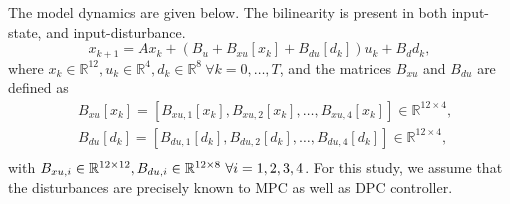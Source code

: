 The model dynamics are given below. The bilinearity is present in both input-state, and input-disturbance.
\begin{equation}\label{E:bilinear1}
x_{k+1} = Ax_{k}+(B_u +B_{xu}[x_k] + B_{du}[d_k]) u_k+B_dd_k,
\end{equation}
where $x_{k} \in \mathbb{R}^{12}, u_{k} \in \mathbb{R}^{4}, d_{k} \in \mathbb{R}^{8} \ \forall k = 0,\dots,T$, and the matrices $B_{xu}$ and $B_{du}$ are defined as
\begin{equation}
	\begin{aligned}
		&B_{xu}[x_k] = [ B_{xu,1}[x_k],B_{xu,2}[x_k], \dots, B_{xu,4}[x_k] ] \in \mathbb{R}^{12\times4}, \\
		&B_{du}[d_k] = [ B_{du,1}[d_k],B_{du,2}[d_k], \dots, B_{du,4}[d_k] ] \in \mathbb{R}^{12\times4}, \\
	\end{aligned}
\end{equation}
with $B_{xu,i} \in \mathbb{R}^{12\times12}, B_{du,i} \in \mathbb{R}^{12\times8} \ \forall i=1,2,3,4$.
For this study, we assume that the disturbances are precisely known to MPC as well as DPC controller.